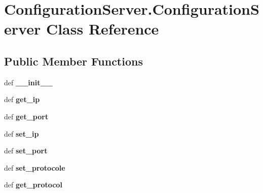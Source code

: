 \hypertarget{classConfigurationServer_1_1ConfigurationServer}{\section{Configuration\+Server.\+Configuration\+Server Class Reference}
\label{classConfigurationServer_1_1ConfigurationServer}
}
\subsection*{Public Member Functions}
\begin{DoxyCompactItemize}
\item 
\hypertarget{classConfigurationServer_1_1ConfigurationServer_ab3812cc3c79614fef4fd6313b6daf644}{def {\bfseries \+\_\+\+\_\+init\+\_\+\+\_\+}}\label{classConfigurationServer_1_1ConfigurationServer_ab3812cc3c79614fef4fd6313b6daf644}

\item 
\hypertarget{classConfigurationServer_1_1ConfigurationServer_ad567cfecce426350ca8d12acd40c9744}{def {\bfseries get\+\_\+ip}}\label{classConfigurationServer_1_1ConfigurationServer_ad567cfecce426350ca8d12acd40c9744}

\item 
\hypertarget{classConfigurationServer_1_1ConfigurationServer_a51cbe5a81222c5c6a2802e89c73394c4}{def {\bfseries get\+\_\+port}}\label{classConfigurationServer_1_1ConfigurationServer_a51cbe5a81222c5c6a2802e89c73394c4}

\item 
\hypertarget{classConfigurationServer_1_1ConfigurationServer_a9769cb69630312ce2413b2776451b832}{def {\bfseries set\+\_\+ip}}\label{classConfigurationServer_1_1ConfigurationServer_a9769cb69630312ce2413b2776451b832}

\item 
\hypertarget{classConfigurationServer_1_1ConfigurationServer_aab99e4fa633e026c619bac03364757aa}{def {\bfseries set\+\_\+port}}\label{classConfigurationServer_1_1ConfigurationServer_aab99e4fa633e026c619bac03364757aa}

\item 
\hypertarget{classConfigurationServer_1_1ConfigurationServer_ad31024ecc213fd80f180afaeca67c1fa}{def {\bfseries set\+\_\+protocole}}\label{classConfigurationServer_1_1ConfigurationServer_ad31024ecc213fd80f180afaeca67c1fa}

\item 
\hypertarget{classConfigurationServer_1_1ConfigurationServer_a6381c30b4b4b0bc2b21d3b97c7c9bb44}{def {\bfseries get\+\_\+protocol}}\label{classConfigurationServer_1_1ConfigurationServer_a6381c30b4b4b0bc2b21d3b97c7c9bb44}


\end{DoxyCompactItemize}
